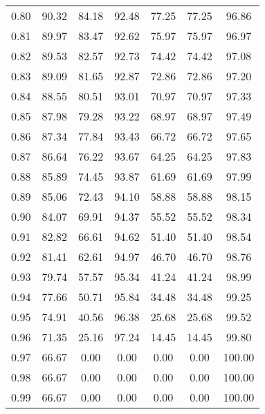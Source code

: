 \begin{tabular}{|c|c|c|c|c|c|c|}
      0.80 &     90.32 &     84.18 &      92.48 &   77.25 &      77.25 &         96.86 \\
      0.81 &     89.97 &     83.47 &      92.62 &   75.97 &      75.97 &         96.97 \\
      0.82 &     89.53 &     82.57 &      92.73 &   74.42 &      74.42 &         97.08 \\
      0.83 &     89.09 &     81.65 &      92.87 &   72.86 &      72.86 &         97.20 \\
      0.84 &     88.55 &     80.51 &      93.01 &   70.97 &      70.97 &         97.33 \\
      0.85 &     87.98 &     79.28 &      93.22 &   68.97 &      68.97 &         97.49 \\
      0.86 &     87.34 &     77.84 &      93.43 &   66.72 &      66.72 &         97.65 \\
      0.87 &     86.64 &     76.22 &      93.67 &   64.25 &      64.25 &         97.83 \\
      0.88 &     85.89 &     74.45 &      93.87 &   61.69 &      61.69 &         97.99 \\
      0.89 &     85.06 &     72.43 &      94.10 &   58.88 &      58.88 &         98.15 \\
      0.90 &     84.07 &     69.91 &      94.37 &   55.52 &      55.52 &         98.34 \\
      0.91 &     82.82 &     66.61 &      94.62 &   51.40 &      51.40 &         98.54 \\
      0.92 &     81.41 &     62.61 &      94.97 &   46.70 &      46.70 &         98.76 \\
      0.93 &     79.74 &     57.57 &      95.34 &   41.24 &      41.24 &         98.99 \\
      0.94 &     77.66 &     50.71 &      95.84 &   34.48 &      34.48 &         99.25 \\
      0.95 &     74.91 &     40.56 &      96.38 &   25.68 &      25.68 &         99.52 \\
      0.96 &     71.35 &     25.16 &      97.24 &   14.45 &      14.45 &         99.80 \\
      0.97 &     66.67 &      0.00 &       0.00 &    0.00 &       0.00 &        100.00 \\
      0.98 &     66.67 &      0.00 &       0.00 &    0.00 &       0.00 &        100.00 \\
      0.99 &     66.67 &      0.00 &       0.00 &    0.00 &       0.00 &        100.00 \\
\bottomrule
\end{tabular}
